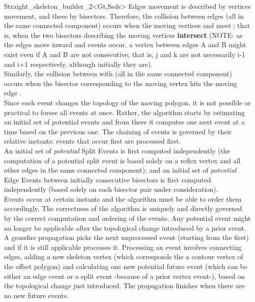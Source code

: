 \begin{ccRefClass}{Straight_skeleton_builder_2<Gt,Ssds>}
Edges movement is described by vertices movement, and these by bisectors. Therefore, the collision between edges  (all in the same connected component) occurs when the moving vertices  and  meet ; that is, when the two bisectors describing the moving vertices 
\textbf{intersect} (NOTE: as the edges move inward and events occur, a vertex between edges A and B might exist even if A and B are not consecutive; that is, j and k are not necessarily i-1 and i+1 respectively, although initially they are).\\
Similarly, the collision between  with  (all in the same connected component) occurs when the bisector corresponding to the moving vertex  hits the moving edge .\\
Since each event changes the topology of the moving polygon, it is not possible or practical to forsee all events at once. Rather, the algorithm starts by estimating an initial set of potential events and from there it computes one next event at a time based on the previous one. The chaining of events is governed by their relative instants: events that occur first are processed first.\\
An initial set of \textit{potential} Split Events is first computed independently (the computation of a potential split event is based solely on a reflex vertex and all other edges in the same connected component); and an initial set of \textit{potential} Edge Events between initially consecutive bisectors is first computed independently (based solely on each bisector pair under consideration).\\
Events occur at certain instants and the algorithm must be able to order them
accordingly. The correctness of the algorithm is uniquely and directly governed by the correct computation and ordering of the events. Any potential event might no longer be applicable after the topological change introduced by a prior event.\\
A grassfire propagation picks the next unprocessed event (starting from the first) and if it is still applicable processes it. Processing an event involves connecting edges, adding a new skeleton vertex (which corresponds the a contour vertex of the offset polygon) and calculating one new potential future event (which can be either an edge event or a split event -because of a prior vertex event-), based on the topological change just introduced. The propagation finishes when there are no new future events.

\ccSeeAlso
{}\\
\\
\\
\\
\\
\\
\\
\end{ccRefClass}


